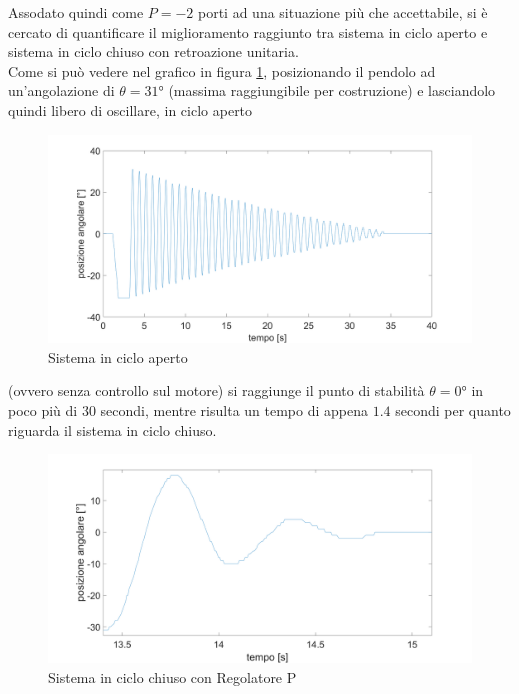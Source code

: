 Assodato quindi come $P=-2$ porti ad una situazione più che accettabile, si è cercato di quantificare il miglioramento raggiunto tra sistema in ciclo aperto e sistema in ciclo chiuso con retroazione unitaria.\\
Come si può vedere nel grafico in figura \ref{oscillOL}, posizionando il pendolo ad un'angolazione di $\theta=\ang{31}$ (massima raggiungibile per costruzione) e lasciandolo quindi libero di oscillare, in ciclo aperto
\begin{figure}[ht]
	\centering
	\includegraphics[width=\linewidth]{oscillOL.PNG}
	\caption{Sistema in ciclo aperto}
	\label{oscillOL}
\end{figure}
 (ovvero senza controllo sul motore) si raggiunge il punto di stabilità $\theta=\ang{0}$ in poco più di $30$ secondi, mentre risulta un tempo di appena $1.4$ secondi per quanto riguarda il sistema in ciclo chiuso.
\begin{figure}[ht]
	\centering
	\includegraphics[width=\linewidth]{oscillCL.PNG}
	\caption{Sistema in ciclo chiuso con Regolatore P}
	\label{oscillCL}
\end{figure} 


